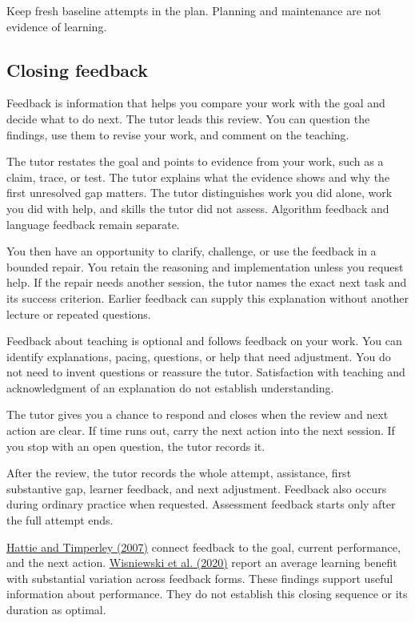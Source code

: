 \documentclass[11pt,letterpaper]{article}
\begin{document}
Keep fresh baseline attempts in the plan. Planning and maintenance are not evidence of learning.

\subsection*{Closing feedback}

Feedback is information that helps you compare your work with the goal and decide what to do next. The tutor leads this review. You can question the findings, use them to revise your work, and comment on the teaching.

The tutor restates the goal and points to evidence from your work, such as a claim, trace, or test. The tutor explains what the evidence shows and why the first unresolved gap matters. The tutor distinguishes work you did alone, work you did with help, and skills the tutor did not assess. Algorithm feedback and language feedback remain separate.

You then have an opportunity to clarify, challenge, or use the feedback in a bounded repair. You retain the reasoning and implementation unless you request help. If the repair needs another session, the tutor names the exact next task and its success criterion. Earlier feedback can supply this explanation without another lecture or repeated questions.

Feedback about teaching is optional and follows feedback on your work. You can identify explanations, pacing, questions, or help that need adjustment. You do not need to invent questions or reassure the tutor. Satisfaction with teaching and acknowledgment of an explanation do not establish understanding.

The tutor gives you a chance to respond and closes when the review and next action are clear. If time runs out, carry the next action into the next session. If you stop with an open question, the tutor records it.

After the review, the tutor records the whole attempt, assistance, first substantive gap, learner feedback, and next adjustment. Feedback also occurs during ordinary practice when requested. Assessment feedback starts only after the full attempt ends.

\href{https://assess.ucr.edu/sites/g/files/rcwecm2336/files/2019-02/hattietimperley_2007.pdf}{Hattie and Timperley (2007)} connect feedback to the goal, current performance, and the next action. \href{https://www.frontiersin.org/journals/psychology/articles/10.3389/fpsyg.2019.03087/full}{Wisniewski et al. (2020)} report an average learning benefit with substantial variation across feedback forms. These findings support useful information about performance. They do not establish this closing sequence or its duration as optimal.
\end{document}
